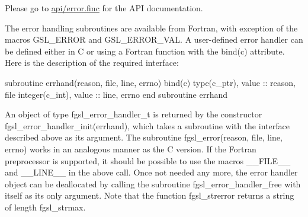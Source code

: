Please go to \hyperlink{error_8finc}{api/error.\+finc} for the A\+P\+I documentation.

The error handling subroutines are available from Fortran, with exception of the macros {\ttfamily G\+S\+L\+\_\+\+E\+R\+R\+O\+R} and {\ttfamily G\+S\+L\+\_\+\+E\+R\+R\+O\+R\+\_\+\+V\+A\+L}. A user-\/defined error handler can be defined either in C or using a Fortran function with the {\ttfamily bind(c)} attribute. Here is the description of the required interface\+: 
\begin{DoxyPre}
 subroutine errhand(reason, file, line, errno) bind(c)
    type(c\_ptr), value :: reason, file
    integer(c\_int), value :: line, errno
 end subroutine errhand
 \end{DoxyPre}
 An object of type {\ttfamily fgsl\+\_\+error\+\_\+handler\+\_\+t} is returned by the constructor {\ttfamily fgsl\+\_\+error\+\_\+handler\+\_\+init(errhand)}, which takes a subroutine with the interface described above as its argument. The subroutine {\ttfamily fgsl\+\_\+error(reason, file, line, errno)} works in an analogous manner as the C version. If the Fortran preprocessor is supported, it should be possible to use the macros {\ttfamily \+\_\+\+\_\+\+F\+I\+L\+E\+\_\+\+\_\+} and {\ttfamily \+\_\+\+\_\+\+L\+I\+N\+E\+\_\+\+\_\+} in the above call. Once not needed any more, the error handler object can be deallocated by calling the subroutine {\ttfamily fgsl\+\_\+error\+\_\+handler\+\_\+free} with itself as its only argument. Note that the function {\ttfamily fgsl\+\_\+strerror} returns a string of length {\ttfamily fgsl\+\_\+strmax}. 